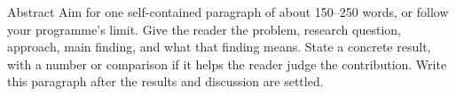 \begin{frontmatterpage}{Abstract}
Aim for one self-contained paragraph of about 150--250 words, or follow your programme's limit. Give the reader the problem, research question, approach, main finding, and what that finding means. State a concrete result, with a number or comparison if it helps the reader judge the contribution. Write this paragraph after the results and discussion are settled.
\end{frontmatterpage}